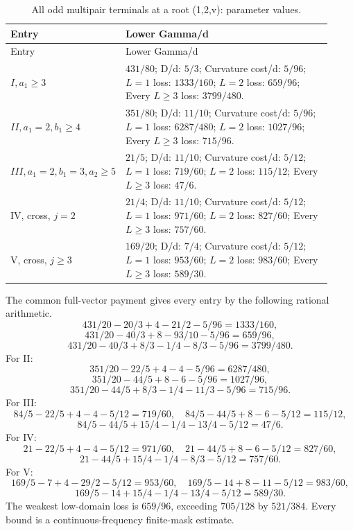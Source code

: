 \begingroup\small
\setlength{\tabcolsep}{3pt}
\setlength{\LTleft}{0pt}\setlength{\LTright}{\fill}
\begin{longtable}{@{}p{0.2200\linewidth}p{0.7000\linewidth}@{}}
\caption{All odd multipair terminals at a root (1,2,v): parameter values.}\label{tab:parameters:q5-c177:1}\\
\toprule
Entry & Lower Gamma/d \\
\midrule\endfirsthead
\toprule
Entry & Lower Gamma/d \\
\midrule\endhead
\bottomrule\endfoot
\(I,\allowbreak a_1\ge 3\) & \(431/80\); D/d: \(5/3\); Curvature cost/d: \(5/96\); \(L=1\) loss: \(1333/160\); \(L=2\) loss: \(659/96\); Every \(L\ge 3\) loss: \(3799/480\). \\
\addlinespace[2pt]
\(II,\allowbreak a_1=2,\allowbreak b_1\ge 4\) & \(351/80\); D/d: \(11/10\); Curvature cost/d: \(5/96\); \(L=1\) loss: \(6287/480\); \(L=2\) loss: \(1027/96\); Every \(L\ge 3\) loss: \(715/96\). \\
\addlinespace[2pt]
\(III,\allowbreak a_1=2,\allowbreak b_1=3,\allowbreak a_2\ge 5\) & \(21/5\); D/d: \(11/10\); Curvature cost/d: \(5/12\); \(L=1\) loss: \(719/60\); \(L=2\) loss: \(115/12\); Every \(L\ge 3\) loss: \(47/6\). \\
\addlinespace[2pt]
IV, cross, \(j=2\) & \(21/4\); D/d: \(11/10\); Curvature cost/d: \(5/12\); \(L=1\) loss: \(971/60\); \(L=2\) loss: \(827/60\); Every \(L\ge 3\) loss: \(757/60\). \\
\addlinespace[2pt]
V, cross, \(j\ge 3\) & \(169/20\); D/d: \(7/4\); Curvature cost/d: \(5/12\); \(L=1\) loss: \(953/60\); \(L=2\) loss: \(983/60\); Every \(L\ge 3\) loss: \(589/30\). \\
\end{longtable}
\endgroup


The common full-vector payment gives every entry by the following rational arithmetic.
\[
431/20-20/3+4-21/2-5/96=1333/160,
\]
\[
431/20-40/3+8-93/10-5/96=659/96,
\]
\[
431/20-40/3+8/3-1/4-8/3-5/96=3799/480.
\]
For II:
\[
351/20-22/5+4-4-5/96=6287/480,
\]
\[
351/20-44/5+8-6-5/96=1027/96,
\]
\[
351/20-44/5+8/3-1/4-11/3-5/96=715/96.
\]
For III:
\[
84/5-22/5+4-4-5/12=719/60,
\quad84/5-44/5+8-6-5/12=115/12,
\]
\[
84/5-44/5+15/4-1/4-13/4-5/12=47/6.
\]
For IV:
\[
21-22/5+4-4-5/12=971/60,
\quad21-44/5+8-6-5/12=827/60,
\]
\[
21-44/5+15/4-1/4-8/3-5/12=757/60.
\]
For V:
\[
169/5-7+4-29/2-5/12=953/60,
\quad169/5-14+8-11-5/12=983/60,
\]
\[
169/5-14+15/4-1/4-13/4-5/12=589/30.
\]
The weakest low-domain loss is \(659/96\), exceeding \(705/128\) by \(521/384\). Every bound is a continuous-frequency finite-mask estimate.


